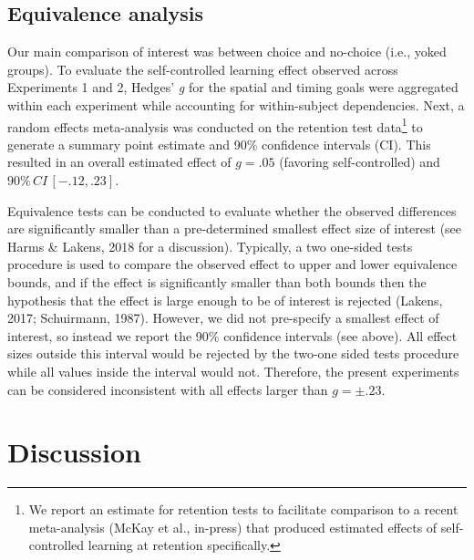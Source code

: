 \documentclass[
  man, donotrepeattitle,floatsintext]{apa7}
\begin{document}
\hypertarget{equivalence-analysis}{%
\subsection{Equivalence analysis}\label{equivalence-analysis}}

Our main comparison of interest was between choice and no-choice (i.e., yoked groups). To evaluate the self-controlled learning effect observed across Experiments 1 and 2, Hedges' \emph{g} for the spatial and timing goals were aggregated within each experiment while accounting for within-subject dependencies. Next, a random effects meta-analysis was conducted on the retention test data\footnote{We report an estimate for retention tests to facilitate comparison to a recent meta-analysis (McKay et al., in-press) that produced estimated effects of self-controlled learning at retention specifically.} to generate a summary point estimate and 90\% confidence intervals (CI). This resulted in an overall estimated effect of \(g = .05\) (favoring self-controlled) and \(90\% \,CI \,[-.12,.23]\).

Equivalence tests can be conducted to evaluate whether the observed differences are significantly smaller than a pre-determined smallest effect size of interest (see Harms \& Lakens, 2018 for a discussion). Typically, a two one-sided tests procedure is used to compare the observed effect to upper and lower equivalence bounds, and if the effect is significantly smaller than both bounds then the hypothesis that the effect is large enough to be of interest is rejected (Lakens, 2017; Schuirmann, 1987). However, we did not pre-specify a smallest effect of interest, so instead we report the 90\% confidence intervals (see above). All effect sizes outside this interval would be rejected by the two-one sided tests procedure while all values inside the interval would not. Therefore, the present experiments can be considered inconsistent with all effects larger than \(g = \pm.23\).

\hypertarget{discussion}{%
\section{Discussion}\label{discussion}}
\end{document}
